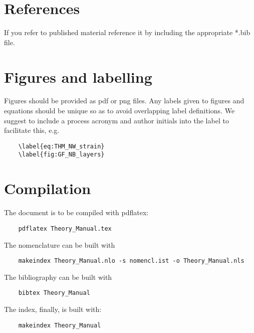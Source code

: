 \section{References}
If you refer to published material reference it by including the appropriate *.bib file.

\section{Figures and labelling}
Figures should be provided as pdf or png files. Any labels given to figures and equations should be unique so as to avoid overlapping label definitions. We suggest to include a process acronym and author initials into the label to facilitate this, e.g.
\begin{verbatim}
	\label{eq:THM_NW_strain}
	\label{fig:GF_NB_layers}
\end{verbatim}

\section{Compilation}
The document is to be compiled with pdflatex:
\begin{verbatim}
	pdflatex Theory_Manual.tex
\end{verbatim}
The nomenclature can be built with
\begin{verbatim}
	makeindex Theory_Manual.nlo -s nomencl.ist -o Theory_Manual.nls
\end{verbatim}
The bibliography can be built with 
\begin{verbatim}
	bibtex Theory_Manual
\end{verbatim}
The index, finally, is built with:
\begin{verbatim}
	makeindex Theory_Manual
\end{verbatim}